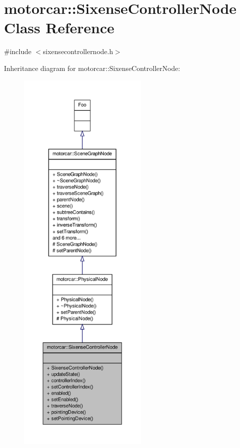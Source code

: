 \hypertarget{classmotorcar_1_1SixenseControllerNode}{\section{motorcar\-:\-:Sixense\-Controller\-Node Class Reference}
\label{classmotorcar_1_1SixenseControllerNode}
}


{\ttfamily \#include $<$sixensecontrollernode.\-h$>$}



Inheritance diagram for motorcar\-:\-:Sixense\-Controller\-Node\-:
\nopagebreak
\begin{figure}[H]
\begin{center}
\leavevmode
\includegraphics[height=550pt]{classmotorcar_1_1SixenseControllerNode__inherit__graph}
\end{center}
\end{figure}


